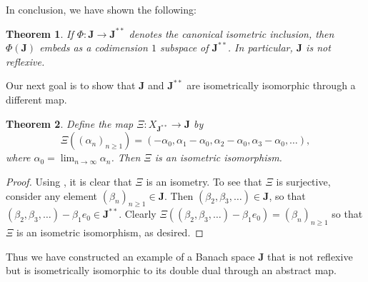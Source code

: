 \documentclass[11pt]{article}
\theoremstyle{thmstyle}
\newtheorem{theorem}{Theorem}[section]
\theoremstyle{defstyle}
\renewcommand{\ge}{\geqslant}
\newcommand{\bfJ}{\mathbf{J}}
\begin{document}
In conclusion, we have shown the following: 
\begin{theorem}
	If $\Phi\colon\bfJ\to\bfJ^{\ast\ast}$ denotes the canonical isometric inclusion, then $\Phi(\bfJ)$ embeds as a codimension $1$ subspace of $\bfJ^{\ast\ast}$. In particular, $\bfJ$ is \emph{not} reflexive.
\end{theorem}

Our next goal is to show that $\bfJ$ and $\bfJ^{\ast\ast}$ are isometrically isomorphic through a different map. 

\begin{theorem}
	Define the map $\Xi\colon X_{\bfJ^{\ast\ast}}\to\bfJ$ by 
	\begin{equation*}
		\Xi\left((\alpha_n)_{n\ge 1}\right) = \left(-\alpha_0, \alpha_1 - \alpha_0, \alpha_2 - \alpha_0 , \alpha_3 - \alpha_0, \dots\right),
	\end{equation*}
	where $\alpha_0 = \displaystyle\lim_{n\to\infty}\alpha_n$. Then $\Xi$ is an isometric isomorphism.
\end{theorem}
\begin{proof}
	Using , it is clear that $\Xi$ is an isometry. To see that $\Xi$ is surjective, consider any element $(\beta_n)_{n\ge 1}\in\bfJ$. Then $(\beta_2, \beta_3, \dots)\in\bfJ$, so that $(\beta_2, \beta_3, \dots) - \beta_1 e_0\in\bfJ^{\ast\ast}$. Clearly $\Xi\left((\beta_2, \beta_3, \dots) - \beta_1 e_0\right) = (\beta_n)_{n\ge 1}$ so that $\Xi$ is an isometric isomorphism, as desired.
\end{proof}

Thus we have constructed an example of a Banach space $\bfJ$ that is not reflexive but is isometrically isomorphic to its double dual through an abstract map.
\end{document}
